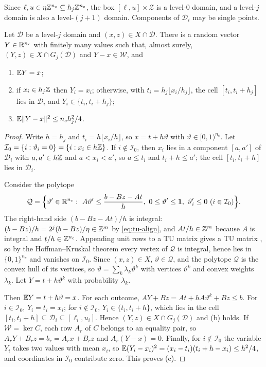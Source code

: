 Since $\ell,u\in\eta\mathbb Z^{n_c}\subseteq h_j\mathbb Z^{n_c}$, the box
$[\ell,u]\times\mathcal Z$ is a level-$0$ domain, and a level-$j$ domain is
also a level-$(j+1)$ domain. Components of $\mathcal D_i$ may be single points.

\begin{lemma}\label{lem:tu-round}
Let $\mathcal D$ be a level-$j$ domain and $(x,z)\in X\cap\mathcal D$. There is
a random vector $Y\in\mathbb R^{n_c}$ with finitely many values such that, almost
surely, $(Y,z)\in X\cap G_j(\mathcal D)$ and $Y-x\in\mathcal W$, and
\begin{enumerate}[label=(\alph*)]
\item $\mathbb E Y=x$;
\item if $x_i\in h_j\mathbb Z$ then $Y_i=x_i$; otherwise, with
$t_i=h_j\lfloor x_i/h_j\rfloor$, the cell $[t_i,t_i+h_j]$ lies in $\mathcal D_i$
and $Y_i\in\{t_i,t_i+h_j\}$;
\item $\mathbb E\lVert Y-x\rVert^2\le n_ch_j^2/4$.
\end{enumerate}
\end{lemma}

\begin{proof}
Write $h=h_j$ and $t_i=h\lfloor x_i/h\rfloor$, so $x=t+h\vartheta$ with
$\vartheta\in[0,1)^{n_c}$. Let
$\mathcal I_0=\{i:\vartheta_i=0\}=\{i:x_i\in h\mathbb Z\}$. If $i\notin\mathcal I_0$,
then $x_i$ lies in a component $[a,a']$ of $\mathcal D_i$ with $a,a'\in h\mathbb Z$
and $a<x_i<a'$, so $a\le t_i$ and $t_i+h\le a'$; the cell $[t_i,t_i+h]$ lies
in $\mathcal D_i$.

Consider the polytope
\[
\mathcal Q=\Bigl\{\vartheta'\in\mathbb R^{n_c}:\ A\vartheta'\le\frac{b-Bz-At}{h},\
0\le\vartheta'\le\mathbf 1,\ \vartheta'_i\le0\ (i\in\mathcal I_0)\Bigr\}.
\]
The right-hand side $(b-Bz-At)/h$ is integral:
$(b-Bz)/h=2^j(b-Bz)/\eta\in\mathbb Z^m$ by \eqref{eq:tu-align}, and $At/h\in\mathbb Z^m$
because $A$ is integral and $t/h\in\mathbb Z^{n_c}$. Appending unit rows to a TU
matrix gives a TU matrix \cite[Section~19.1]{Schrijver1986}, so by the
Hoffman--Kruskal theorem \cite{HoffmanKruskal1956} every vertex of $\mathcal Q$
is integral, hence lies in $\{0,1\}^{n_c}$ and vanishes on $\mathcal I_0$.
Since $(x,z)\in X$, $\vartheta\in\mathcal Q$, and the polytope $\mathcal Q$ is
the convex hull of its vertices, so $\vartheta=\sum_k\lambda_k\vartheta^k$ with
vertices $\vartheta^k$ and convex weights $\lambda_k$. Let
$Y=t+h\vartheta^k$ with probability $\lambda_k$.

Then $\mathbb E Y=t+h\vartheta=x$. For each outcome,
$AY+Bz=At+hA\vartheta^k+Bz\le b$. For $i\in\mathcal I_0$, $Y_i=t_i=x_i$; for
$i\notin\mathcal I_0$, $Y_i\in\{t_i,t_i+h\}$, which lies in the cell
$[t_i,t_i+h]\subseteq\mathcal D_i\subseteq[\ell_i,u_i]$. Hence
$(Y,z)\in X\cap G_j(\mathcal D)$ and (b) holds. If $\mathcal W=\ker C$, each row
$A_r$ of $C$ belongs to an equality pair, so $A_rY+B_rz=b_r=A_rx+B_rz$ and
$A_r(Y-x)=0$. Finally, for $i\notin\mathcal I_0$ the variable $Y_i$ takes two
values with mean $x_i$, so $\mathbb E(Y_i-x_i)^2=(x_i-t_i)(t_i+h-x_i)\le h^2/4$, and
coordinates in $\mathcal I_0$ contribute zero. This proves (c).
\end{proof}

